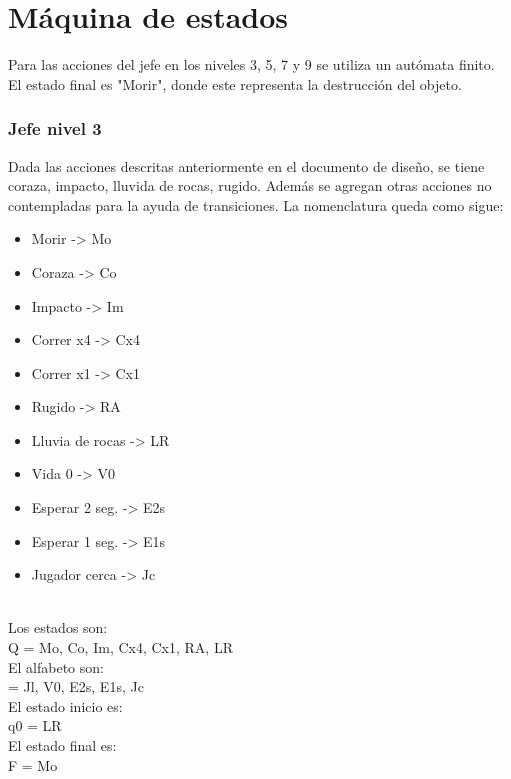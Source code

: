 \section{Máquina de estados}\label{maquinaEdos}
Para las acciones del jefe en los niveles 3, 5, 7 y 9 se utiliza un autómata finito. El estado final es "Morir", donde este representa la destrucción del objeto. 
	\\[1pt]
	
\subsubsection{Jefe nivel 3}
Dada las acciones descritas anteriormente en el documento de diseño, se tiene coraza, impacto, lluvida de rocas, rugido. Además se agregan otras acciones no contempladas para la ayuda de transiciones.
La nomenclatura queda como sigue:
	\\[1pt]
	
\begin{itemize}
	\item Morir -> Mo
	\item Coraza -> Co
	\item Impacto -> Im
	\item Correr x4 -> Cx4
	\item Correr x1 -> Cx1
	\item Rugido -> RA
	\item Lluvia de rocas -> LR
	\item Vida 0 -> V0
	\item Esperar 2 seg. -> E2s
	\item Esperar 1 seg. -> E1s
	\item Jugador cerca -> Jc
\end{itemize}
	\\[1pt]

Los estados son:
	\\[1pt]
	Q = {Mo, Co, Im, Cx4, Cx1, RA, LR}
		\\[1pt]
		
El alfabeto son:
	\\[1pt]
	\sigma = {Jl, V0, E2s, E1s, Jc}
		\\[1pt]
		
El estado inicio es:
	\\[1pt]
	q0 = {LR}
		\\[1pt]
		
El estado final es:
	\\[1pt]
	F = {Mo}
		\\[1pt]

